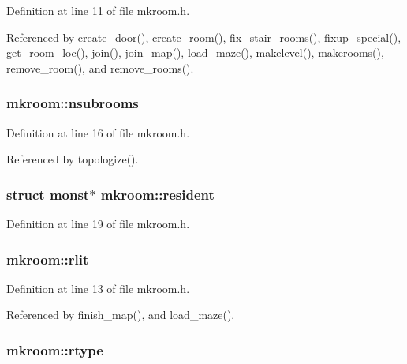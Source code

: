 Definition at line 11 of file mkroom.\+h.



Referenced by create\+\_\+door(), create\+\_\+room(), fix\+\_\+stair\+\_\+rooms(), fixup\+\_\+special(), get\+\_\+room\+\_\+loc(), join(), join\+\_\+map(), load\+\_\+maze(), makelevel(), makerooms(), remove\+\_\+room(), and remove\+\_\+rooms().

\hypertarget{structmkroom_ad45b51274d899541dc61dfa169e06ffb}{
\subsubsection[{nsubrooms}]{ mkroom\+::nsubrooms}}\label{structmkroom_ad45b51274d899541dc61dfa169e06ffb}


Definition at line 16 of file mkroom.\+h.



Referenced by topologize().

\hypertarget{structmkroom_af149eb253a29f709903a497918269d3c}{
\subsubsection[{resident}]{\setlength{\rightskip}{0pt plus 5cm}struct {\bf monst}$\ast$ mkroom\+::resident}}\label{structmkroom_af149eb253a29f709903a497918269d3c}


Definition at line 19 of file mkroom.\+h.

\hypertarget{structmkroom_a3c07fba081cb449add4c4cc858541b16}{
\subsubsection[{rlit}]{ mkroom\+::rlit}}\label{structmkroom_a3c07fba081cb449add4c4cc858541b16}


Definition at line 13 of file mkroom.\+h.



Referenced by finish\+\_\+map(), and load\+\_\+maze().

\hypertarget{structmkroom_a0ad2dc1a7e0527610e96e830b2cad471}{
\subsubsection[{rtype}]{ mkroom\+::rtype}}\label{structmkroom_a0ad2dc1a7e0527610e96e830b2cad471}


